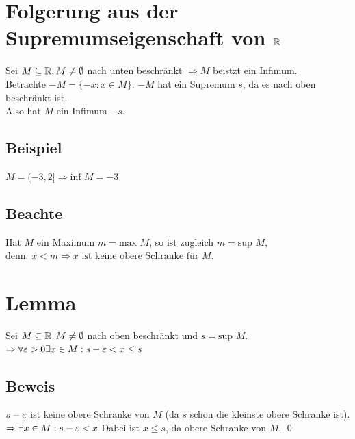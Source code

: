 \section{\texorpdfstring{Folgerung aus der Supremumseigenschaft von $\mathbb{R}$}{Folgerung aus der Supremumseigenschaft von \R}}\label{3.12}
Sei $M \subseteq \mathbb{R}, M \neq \emptyset$ nach unten beschränkt $\Rightarrow M$ beistzt ein Infimum.\\
Betrachte $-M = \{-x : x \in M\}$. $-M$ hat ein Supremum $s$, da es nach oben beschränkt ist.\\
Also hat $M$ ein Infimum $-s$.\nl
{}

\subsection*{Beispiel}
$M=(-3,2] \Rightarrow \text{inf } M = -3$

\subsection*{Beachte}
Hat $M$ ein Maximum $m=\text{max } M$, so ist zugleich $m=\text{sup } M$,\\
denn: $x<m \Rightarrow x \text{ ist keine obere Schranke für } M$.

\section{Lemma}\label{3.13}
Sei $M \subseteq \mathbb{R}, M \neq \emptyset$ nach oben beschränkt und $s = \text{sup }M$.\\
$\Rightarrow \forall \varepsilon>0 \exists x \in M:s-\varepsilon<x \le s$

\subsection*{Beweis}
$s-\varepsilon$ ist keine obere Schranke von $M$ (da $s$ schon die kleinste obere Schranke ist).\\
$\Rightarrow \exists x \in M:s-\varepsilon<x$ Dabei ist $x \le s$, da obere Schranke von $M$. \qed

